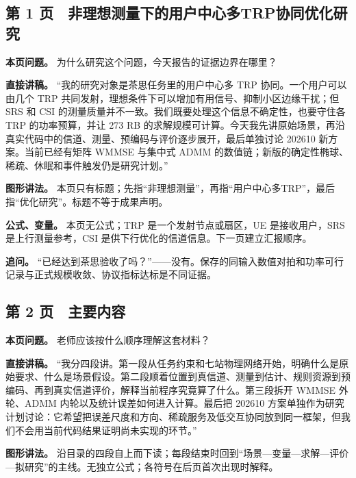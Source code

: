 \documentclass[11pt,a4paper]{ctexart}
\begin{document}
\subsection*{第 1 页　非理想测量下的用户中心多TRP协同优化研究}

\textbf{本页问题。} 为什么研究这个问题，今天报告的证据边界在哪里？\par

\textbf{直接讲稿。} “我的研究对象是茶思任务里的用户中心多 TRP 协同。一个用户可以由几个 TRP 共同发射，理想条件下可以增加有用信号、抑制小区边缘干扰；但 SRS 和 CSI 的测量质量并不一致。我们既要处理这个信息不确定性，也要守住各 TRP 的功率预算，并让 273 RB 的求解规模可计算。今天我先讲原始场景，再沿真实代码中的信道、测量、预编码与评价逐步展开，最后单独讨论 202610 新方案。当前已经有矩阵 WMMSE 与集中式 ADMM 的数值链；新版的确定性椭球、稀疏、休眠和事件触发仍是研究计划。”\par

\textbf{图形讲法。} 本页只有标题；先指“非理想测量”，再指“用户中心多TRP”，最后指“优化研究”。标题不等于成果声明。\par

\textbf{公式、变量。} 本页无公式；TRP 是一个发射节点或扇区，UE 是接收用户，SRS 是上行测量参考，CSI 是供下行优化的信道信息。下一页建立汇报顺序。\par

\textbf{追问。} “已经达到茶思验收了吗？”——没有。保存的同输入数值对拍和功率可行记录与正式规模收敛、协议指标达标是不同证据。\par

\subsection*{第 2 页　主要内容}

\textbf{本页问题。} 老师应该按什么顺序理解这套材料？\par

\textbf{直接讲稿。} “我分四段讲。第一段从任务约束和七站物理网络开始，明确什么是原始要求、什么是场景假设。第二段顺着位置到真信道、测量到估计、规则资源到预编码、再到真实信道评价，解释当前程序究竟算了什么。第三段拆开 WMMSE 外轮、ADMM 内轮以及统计误差如何进入计算。最后把 202610 方案单独作为研究计划讨论：它希望把误差尺度和方向、稀疏服务及低交互协同放到同一框架，但我们不会用当前代码结果证明尚未实现的环节。”\par

\textbf{图形讲法。} 沿目录的四段自上而下读；每段结束时回到“场景—变量—求解—评价—拟研究”的主线。无独立公式；各符号在后页首次出现时解释。\par
\end{document}
